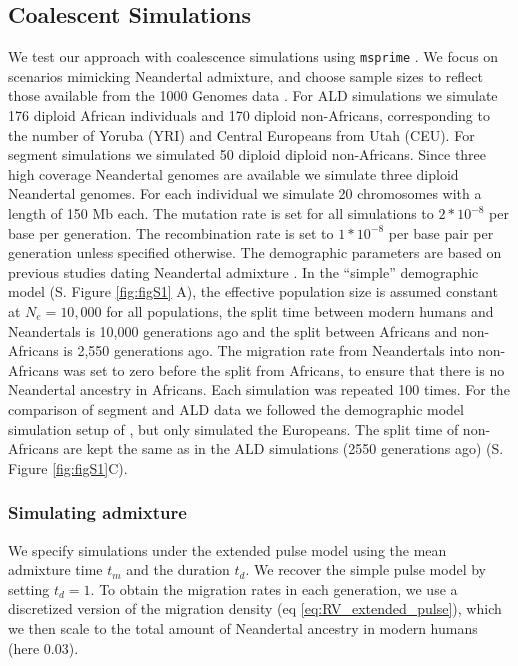 \documentclass[11pt]{article}
\begin{document}
\subsection{Coalescent Simulations}\label{coalescent simulations}

We test our approach with coalescence simulations using  \texttt{msprime} 
\citep{kelleher_efficient_2016}. We focus on scenarios mimicking Neandertal admixture, and choose sample sizes to reflect those available from the 1000 Genomes data \citep{the_1000_genomes_project_consortium_global_2015}. For ALD simulations we simulate 176 diploid
African individuals and 170 diploid non-Africans, corresponding to the
number of Yoruba (YRI) and Central Europeans from Utah (CEU). For segment simulations we simulated 50 diploid diploid non-Africans.
Since three high coverage Neandertal genomes are available \citep{prufer_complete_2013,prufer_high-coverage_2017,mafessoni_high_coverage_2020} we  simulate three diploid Neandertal genomes. For each individual we simulate 20
chromosomes with a length of 150 Mb each. The mutation rate is set for
all simulations to \(2*10^{-8}\) per base per generation. The
recombination rate is set to \(1*10^{-8}\) per base pair per generation
unless specified otherwise. The demographic parameters are based on
previous studies dating Neandertal admixture
\citep{sankararaman_date_2012,fu_genome_2014,moorjani_genetic_2016}. In
the ``simple'' demographic model (S. Figure  \ref{fig:figS1} A), the effective
population size is assumed constant at $N_e=10,000$ for all populations, the
split time between modern humans and Neandertals is 10,000 generations
ago and the split between Africans and non-Africans is 2,550
generations ago. The migration rate from Neandertals into non-Africans
was set to zero before the split from Africans, to ensure that there is no Neandertal
ancestry in Africans. Each simulation was repeated 100 times. For the comparison of segment and ALD data we followed the demographic model simulation setup of \cite{skov_detecting_2018}, but only simulated the Europeans. The split time of  non-Africans are kept the same as in the ALD simulations (2550 generations ago) (S. Figure \ref{fig:figS1}C).  


\subsubsection{Simulating admixture}\label{Simulating the expanded pulse}
We specify simulations under the extended pulse model using the mean admixture time $t_m$ and the duration $t_d$. We recover the simple pulse model by setting $t_d=1$. To obtain the migration rates in each generation, we use a discretized version of the migration density (eq \ref{eq:RV_extended_pulse}), which we then scale to the total amount of Neandertal ancestry in modern humans (here 0.03). 
\end{document}
